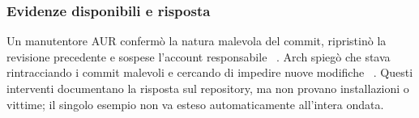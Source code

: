 \subsubsection{Evidenze disponibili e risposta}
Un manutentore AUR confermò la natura malevola del commit, ripristinò la
revisione precedente e sospese l'account responsabile
~\cite{aur-mail-gnome-randr}. Arch spiegò che stava rintracciando i commit
malevoli e cercando di impedire nuove modifiche
~\cite{arch-aur-incident-2026}. Questi interventi documentano la risposta sul
repository, ma non provano installazioni o vittime; il singolo esempio non va
esteso automaticamente all'intera ondata.
